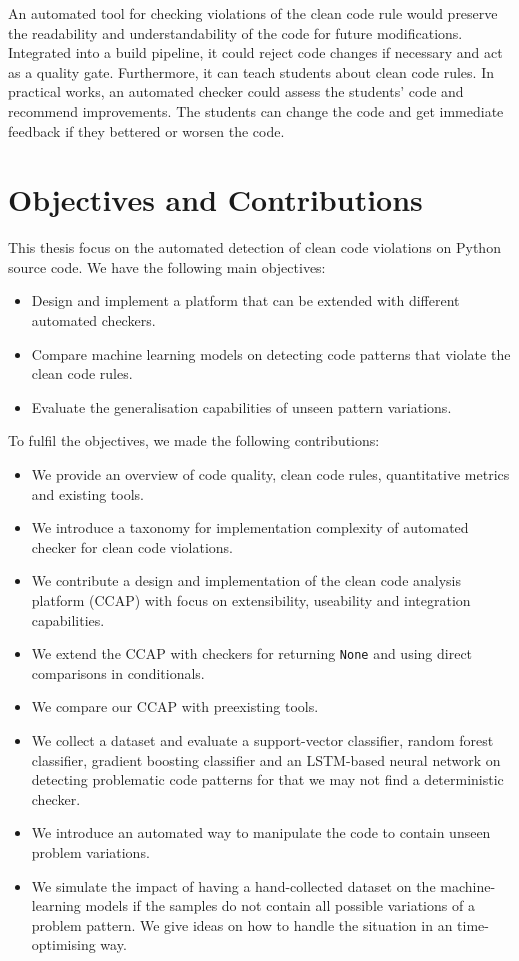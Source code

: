 An automated tool for checking violations of the clean code rule would preserve the readability and understandability of the code for future modifications. Integrated into a build pipeline, it could reject code changes if necessary and act as a quality gate.
Furthermore, it can teach students about clean code rules. In practical works, an automated checker could assess the students' code and recommend improvements. The students can change the code and get immediate feedback if they bettered or worsen the code.


\section{Objectives and Contributions}
This thesis focus on the automated detection of clean code violations on Python source code. 
We have the following main objectives:
\begin{itemize}
    \item Design and implement a platform that can be extended with different automated checkers.
    \item Compare machine learning models on detecting code patterns that violate the clean code rules.
    \item Evaluate the generalisation capabilities of unseen pattern variations.  
\end{itemize}

To fulfil the objectives, we made the following contributions:
\begin{itemize}
    \item We provide an overview of code quality, clean code rules, quantitative metrics and existing tools.
    \item We introduce a taxonomy for implementation complexity of automated checker for clean code violations.
    \item We contribute a design and implementation of the clean code analysis platform (CCAP) with focus on extensibility, useability and integration capabilities.
    \item We extend the CCAP with checkers for returning \texttt{None} and using direct comparisons in conditionals.
    \item We compare our CCAP with preexisting tools.
    \item We collect a dataset and evaluate a support-vector classifier, random forest classifier, gradient boosting classifier and an LSTM-based neural network on detecting problematic code patterns for that we may not find a deterministic checker.
    \item We introduce an automated way to manipulate the code to contain unseen problem variations.
    \item We simulate the impact of having a hand-collected dataset on the machine-learning models if the samples do not contain all possible variations of a problem pattern. We give ideas on how to handle the situation in an time-optimising way.
\end{itemize}

